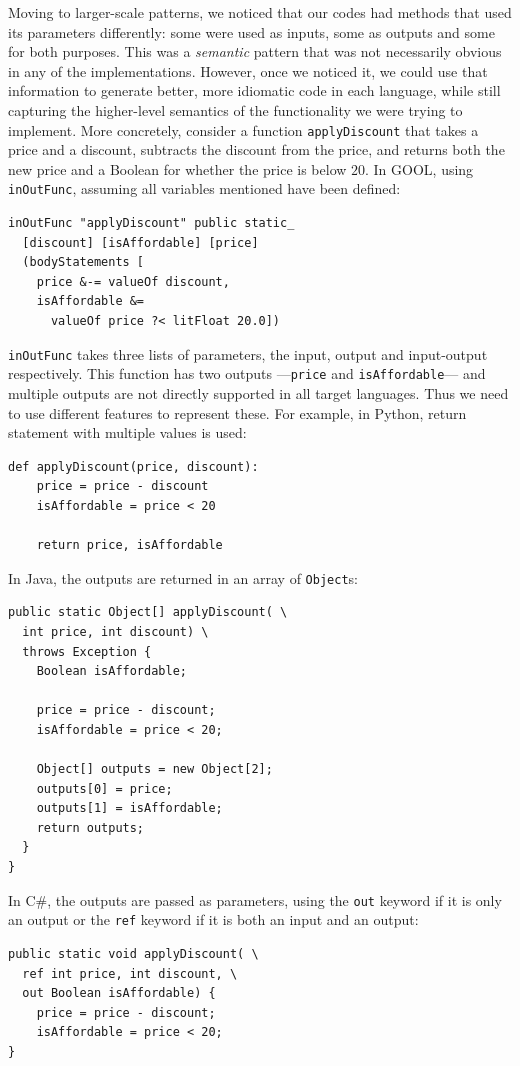\documentclass[sigplan,review,anonymous,prologue,dvipsnames]{acmart}
\newcommand{\Csharp}{C\#}
\begin{document}
Moving to larger-scale patterns, we noticed that our codes had methods that
used its parameters differently: some were used as inputs, some as outputs
and some for both purposes.  This was a \emph{semantic} pattern that was
not necessarily obvious in any of the implementations. However, once we noticed it,
we could use that information to generate better, more idiomatic code in
each language, while still capturing the higher-level semantics of the
functionality we were trying to implement.  More concretely, consider a
function \verb|applyDiscount| that takes a price and a discount, subtracts the
discount from the price, and returns both the new price and a Boolean for
whether the price is below $20$. In GOOL, using \verb|inOutFunc|, assuming
all variables mentioned have been defined:
\begin{lstlisting}
inOutFunc "applyDiscount" public static_
  [discount] [isAffordable] [price]
  (bodyStatements [
    price &-= valueOf discount,
    isAffordable &=
      valueOf price ?< litFloat 20.0])
\end{lstlisting}
\verb|inOutFunc| takes three lists of parameters, the input, output and
input-output respectively.  This function has two outputs
---\verb|price| and \verb|isAffordable|--- and multiple outputs are
not directly supported in all target languages.  Thus we need to use
different features to represent these.  For example, in Python,
return statement with multiple values is used:
\begin{lstlisting}
def applyDiscount(price, discount):
    price = price - discount
    isAffordable = price < 20

    return price, isAffordable
\end{lstlisting}
In Java, the outputs are returned in an array of \verb|Object|s:
\begin{lstlisting}
public static Object[] applyDiscount( \
  int price, int discount) \
  throws Exception {
    Boolean isAffordable;

    price = price - discount;
    isAffordable = price < 20;

    Object[] outputs = new Object[2];
    outputs[0] = price;
    outputs[1] = isAffordable;
    return outputs;
  }
}
\end{lstlisting}
In \Csharp, the outputs are passed as parameters, using the \verb|out| keyword if
it is only an output or the \verb|ref| keyword if it is both an input and an
output:
\begin{lstlisting}
public static void applyDiscount( \
  ref int price, int discount, \
  out Boolean isAffordable) {
    price = price - discount;
    isAffordable = price < 20;
}
\end{lstlisting}
\end{document}
